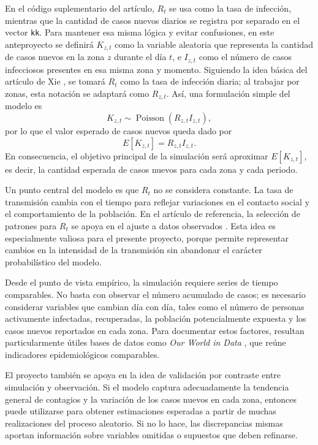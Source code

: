 \documentclass[12pt]{article}
\begin{document}
En el código suplementario del artículo, \(R_t\) se usa como la tasa de
infección, mientras que la cantidad de casos nuevos diarios se registra por
separado en el vector \texttt{kk}. Para mantener esa misma lógica y evitar
confusiones, en este anteproyecto se definirá \(K_{z,t}\) como la variable
aleatoria que representa la cantidad de casos nuevos en la zona \(z\) durante
el día \(t\), e \(I_{z,t}\) como el número de casos infecciosos presentes en
esa misma zona y momento. Siguiendo la idea básica del artículo de
Xie \cite{Xie2020}, se tomará \(R_t\) como la tasa de infección diaria; al
trabajar por zonas, esta notación se adaptará como \(R_{z,t}\). Así, una
formulación simple del modelo es
\[
  K_{z,t} \sim \operatorname{Poisson}(R_{z,t} I_{z,t}),
\]
por lo que el valor esperado de casos nuevos queda dado por
\[
  E[K_{z,t}] = R_{z,t} I_{z,t}.
\]
En consecuencia, el objetivo principal de la simulación será aproximar
\(E[K_{z,t}]\), es decir, la cantidad esperada de casos nuevos para cada zona y
cada periodo.

Un punto central del modelo es que \(R_t\) no se considera constante. La tasa
de transmisión cambia con el tiempo para reflejar variaciones en el contacto
social y el comportamiento de la población. En el artículo de referencia, la
selección de patrones para \(R_t\) se apoya en el ajuste a datos observados
\cite{Xie2020}. Esta idea es especialmente valiosa para el presente proyecto,
porque permite representar cambios en la intensidad de la transmisión sin
abandonar el carácter probabilístico del modelo.

Desde el punto de vista empírico, la simulación requiere series de tiempo
comparables. No basta con observar el número acumulado de casos; es necesario
considerar variables que cambian día con día, tales como el número de personas
activamente infectadas, recuperadas, la población potencialmente expuesta y los
casos nuevos reportados en cada zona. Para documentar estos factores, resultan
particularmente útiles bases de datos como \textit{Our World in Data}
\cite{owid-coronavirus}, que reúne indicadores epidemiológicos comparables.

El proyecto también se apoya en la idea de validación por contraste entre
simulación y observación.
Si el modelo captura adecuadamente la tendencia general de contagios y la
variación de los casos nuevos en cada zona, entonces puede utilizarse para
obtener estimaciones esperadas a partir de muchas realizaciones del proceso
aleatorio. Si no lo hace, las discrepancias mismas aportan información sobre
variables omitidas o supuestos que deben refinarse.
\end{document}
